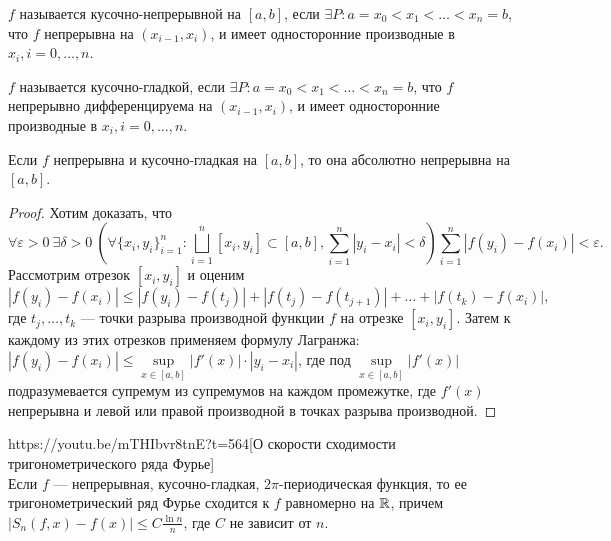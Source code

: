 \begin{Def}
	$f$ называется кусочно-непрерывной на $[a,b]$, если $\exists P:a=x_0<x_1<\ldots<x_n=b$, что $f$ непрерывна на $(x_{i-1},x_i)$, и имеет односторонние производные в $x_i, i=0,\ldots,n$.
\end{Def}

\begin{Def}
	$f$ называется кусочно-гладкой, если $\exists P:a=x_0<x_1<\ldots<x_n=b$, что $f$ непрерывно дифференцируема на $(x_{i-1},x_i)$, и имеет односторонние производные в $x_i, i=0,\ldots,n$.
\end{Def}

\begin{corollary}
	Если $f$ непрерывна и кусочно-гладкая на $[a,b]$, то она абсолютно непрерывна на $[a,b]$.
\end{corollary}

\begin{proof}
	Хотим доказать, что $$\forall\varepsilon>0\ \exists\delta>0\ \left(\forall\{x_i, y_i\}_{i=1}^n: \bigsqcup\limits_{i=1}^n[x_i,y_i]\subset[a,b],\sum\limits_{i=1}^n|y_i-x_i|<\delta\right) \sum\limits_{i=1}^n|f(y_i)-f(x_i)|<\varepsilon.$$
	Рассмотрим отрезок $[x_i,y_i]$ и оценим $$\left|f(y_i)-f(x_i)\right|\leqslant |f(y_i)-f(t_j)|+|f(t_j)-f(t_{j+1})|+\ldots+|f(t_k)-f(x_i)|, $$ 
	где $t_j,\ldots, t_k$ --- точки разрыва производной функции $f$ на отрезке $[x_i,y_i]$. Затем к каждому из этих отрезков применяем формулу Лагранжа: $|f(y_i)-f(x_i)|\leqslant\sup\limits_{x\in[a,b]}|f'(x)|\cdot|y_i-x_i|$, где под $\sup\limits_{x\in[a,b]}|f'(x)|$ подразумевается супремум из супремумов на каждом промежутке, где $f'(x)$ непрерывна и левой или правой производной в точках разрыва производной.
\end{proof}

\begin{linkthm}{https://youtu.be/mTHIbvr8tnE?t=564}[О скорости сходимости тригонометрического ряда Фурье]\ \\
	Если $f$ --- непрерывная, кусочно-гладкая, $2\pi$-периодическая функция, то ее тригонометрический ряд Фурье сходится к $f$ равномерно на $\mathbb{R}$, причем $|S_n(f,x)-f(x)|\leqslant C\frac{\ln n}{n}$, где $C$ не зависит от $n$.
\end{linkthm}

